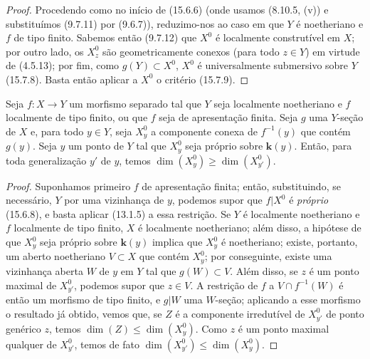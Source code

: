\begin{proof}
Procedendo como no início de (15.6.6) (onde usamos (8.10.5, (v)) e substituímos (9.7.11) por (9.6.7)), reduzimo-nos ao caso em que $Y$ é noetheriano e $f$ de tipo finito. Sabemos então (9.7.12) que $X^0$ é localmente construtível em $X$; por outro lado, os $X_z^0$ são geometricamente conexos (para todo $z\in Y$) em virtude de (4.5.13); por fim, como $g(Y)\subset X^0$, $X^0$ é universalmente submersivo sobre $Y$ (15.7.8). Basta então aplicar a $X^0$ o critério (15.7.9).
\end{proof}

\begin{corollary}[15.6.9]
\label{IV.15.6.9}
Seja $f:X\to Y$ um morfismo separado tal que $Y$ seja localmente noetheriano e $f$ localmente de tipo finito, ou que $f$ seja de apresentação finita. Seja $g$ uma $Y$-seção de $X$ e, para todo $y\in Y$, seja $X_y^0$ a componente conexa de $f^{-1}(y)$ que contém $g(y)$. Seja $y$ um ponto de $Y$ tal que $X_y^0$ seja próprio sobre $\mathbf{k}(y)$. Então, para toda generalização $y'$ de $y$, temos $\dim(X_y^0)\geqslant\dim(X_{y'}^0)$.
\end{corollary}

\begin{proof}
Suponhamos primeiro $f$ de apresentação finita; então, substituindo, se necessário, $Y$ por uma vizinhança de $y$, podemos supor que $f|X^0$ é \emph{próprio} (15.6.8), e basta aplicar (13.1.5) a essa restrição. Se $Y$ é localmente noetheriano e $f$ localmente de tipo finito, $X$ é localmente noetheriano; além disso, a hipótese de que $X_y^0$ seja próprio sobre $\mathbf{k}(y)$ implica que $X_y^0$ é noetheriano; existe, portanto, um aberto noetheriano $V\subset X$ que contém $X_y^0$; por conseguinte, existe uma vizinhança aberta $W$ de $y$ em $Y$ tal que $g(W)\subset V$. Além disso, se $z$ é um ponto maximal de $X_{y'}^0$, podemos supor que $z\in V$. A restrição de $f$ a $V\cap f^{-1}(W)$ é então um morfismo de tipo finito, e $g|W$ uma $W$-seção; aplicando a esse morfismo o resultado já obtido, vemos que, se $Z$ é a componente irredutível de $X_{y'}^0$ de ponto genérico $z$, temos $\dim(Z)\leqslant\dim(X_y^0)$. Como $z$ é um ponto maximal qualquer de $X_{y'}^0$, temos de fato $\dim(X_{y'}^0)\leqslant\dim(X_y^0)$.
\end{proof}

